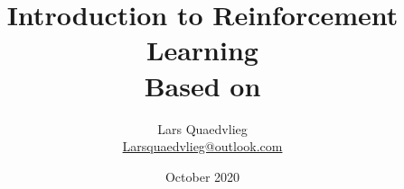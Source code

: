 \documentclass[a4paper,12pt]{book}
\begin{document}
\author{Lars Quaedvlieg \\ \href{mailto:Larsquaedvlieg@outlook.com}{Larsquaedvlieg@outlook.com}}
\title{Introduction to Reinforcement Learning \\ \Large Based on \cite{silver2015}}
\date{October 2020}

\frontmatter
\maketitle
\let\cleardoublepage\clearpage
\tableofcontents

\mainmatter

\let\cleardoublepage\clearpage

\let\cleardoublepage\clearpage

\let\cleardoublepage\clearpage

\let\cleardoublepage\clearpage

\let\cleardoublepage\clearpage

\let\cleardoublepage\clearpage

\let\cleardoublepage\clearpage

\let\cleardoublepage\clearpage

\let\cleardoublepage\clearpage

\let\cleardoublepage\clearpage

\backmatter


\end{document}
